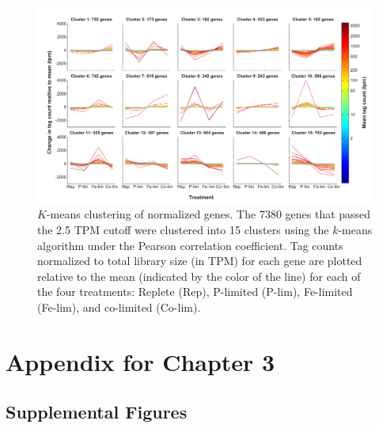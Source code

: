 \begin{landscape}
   \null         %
   \vfill        %
   \centering 
    \begin{figure}
    \centering
        \includegraphics[width=1\textwidth]{Images/C2_FigureS2_v6.pdf}
        \caption[$K$-means clustering of normalized genes]{$K$-means clustering of normalized genes. The 7380 genes that passed the 2.5 TPM cutoff were clustered into 15 clusters using the $k$-means algorithm under the Pearson correlation coefficient. Tag counts normalized to total library size (in TPM) for each gene are plotted relative to the mean (indicated by the color of the line) for each of the four treatments: Replete (Rep), P-limited (P-lim), Fe-limited (Fe-lim), and co-limited (Co-lim).}
    \label{fig:a1f2} 
    \end{figure}
    \vfill        %
\end{landscape}

\clearpage
\newpage





\section{Appendix for Chapter 3}
\subsection{Supplemental Figures}

